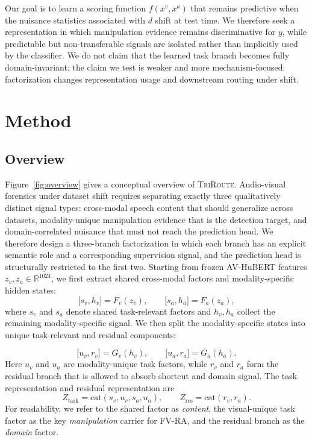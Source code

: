 \documentclass{article}
\newcommand{\method}{\textsc{TriRoute}}
\newcommand{\R}{\mathbb{R}}
\begin{document}
Our goal is to learn a scoring function $f(x^v, x^a)$ that remains predictive when the nuisance statistics associated with $d$ shift at test time. We therefore seek a representation in which manipulation evidence remains discriminative for $y$, while predictable but non-transferable signals are isolated rather than implicitly used by the classifier. We do not claim that the learned task branch becomes fully domain-invariant; the claim we test is weaker and more mechanism-focused: factorization changes representation usage and downstream routing under shift.

\section{Method}

\subsection{Overview}

Figure~\ref{fig:overview} gives a conceptual overview of \method. Audio-visual forensics under dataset shift requires separating exactly three qualitatively distinct signal types: cross-modal speech content that should generalize across datasets, modality-unique manipulation evidence that is the detection target, and domain-correlated nuisance that must not reach the prediction head. We therefore design a three-branch factorization in which each branch has an explicit semantic role and a corresponding supervision signal, and the prediction head is structurally restricted to the first two. Starting from frozen AV-HuBERT features $z_v, z_a \in \R^{1024}$, we first extract shared cross-modal factors and modality-specific hidden states:
\begin{equation}
\big[s_v, h_v\big] = F_v(z_v), \qquad \big[s_a, h_a\big] = F_a(z_a),
\end{equation}
where $s_v$ and $s_a$ denote shared task-relevant factors and $h_v, h_a$ collect the remaining modality-specific signal. We then split the modality-specific states into unique task-relevant and residual components:

\begin{equation}
\big[u_v, r_v\big] = G_v(h_v), \qquad \big[u_a, r_a\big] = G_a(h_a).
\end{equation}
Here $u_v$ and $u_a$ are modality-unique task factors, while $r_v$ and $r_a$ form the residual branch that is allowed to absorb shortcut and domain signal. The task representation and residual representation are
\begin{equation}
Z_{\mathrm{task}} = \mathrm{cat}(s_v, u_v, s_a, u_a), \qquad
Z_{\mathrm{res}} = \mathrm{cat}(r_v, r_a).
\end{equation}
For readability, we refer to the shared factor as \emph{content}, the visual-unique task factor as the key \emph{manipulation} carrier for FV-RA, and the residual branch as the \emph{domain} factor.
\end{document}
